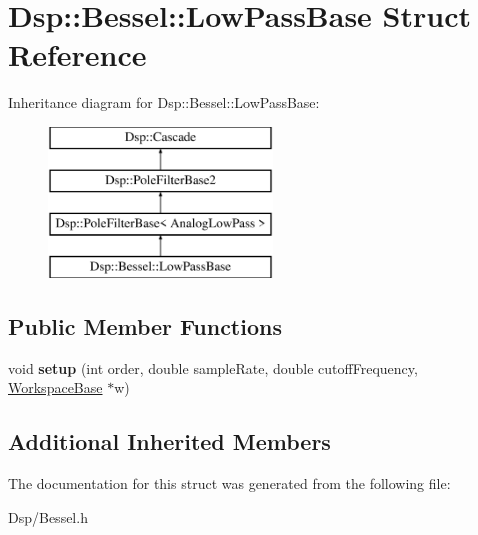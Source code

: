 \hypertarget{structDsp_1_1Bessel_1_1LowPassBase}{\section{Dsp\-:\-:Bessel\-:\-:Low\-Pass\-Base Struct Reference}
\label{structDsp_1_1Bessel_1_1LowPassBase}
}
Inheritance diagram for Dsp\-:\-:Bessel\-:\-:Low\-Pass\-Base\-:\begin{figure}[H]
\begin{center}
\leavevmode
\includegraphics[height=4.000000cm]{structDsp_1_1Bessel_1_1LowPassBase}
\end{center}
\end{figure}
\subsection*{Public Member Functions}
\begin{DoxyCompactItemize}
\item 
\hypertarget{structDsp_1_1Bessel_1_1LowPassBase_a76a07e7fbfbcf73b0f963556b9c847b7}{void {\bfseries setup} (int order, double sample\-Rate, double cutoff\-Frequency, \hyperlink{structDsp_1_1Bessel_1_1WorkspaceBase}{Workspace\-Base} $\ast$w)}\label{structDsp_1_1Bessel_1_1LowPassBase_a76a07e7fbfbcf73b0f963556b9c847b7}

\end{DoxyCompactItemize}
\subsection*{Additional Inherited Members}


The documentation for this struct was generated from the following file\-:\begin{DoxyCompactItemize}
\item 
Dsp/Bessel.\-h\end{DoxyCompactItemize}
